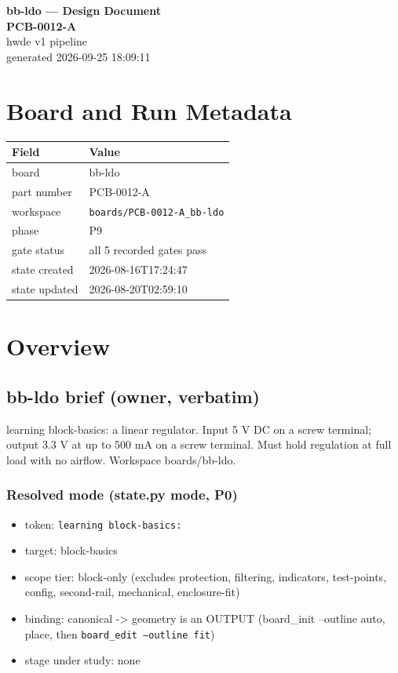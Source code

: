 \documentclass[11pt,a4paper]{article}
\begin{document}
\sloppy
\begin{center}
{\LARGE\bfseries bb-ldo --- Design Document}\\[6pt]
{\Large\bfseries PCB-0012-A}\\[6pt]
{\large hwde v1 pipeline}\\[2pt]
generated 2026-09-25 18:09:11
\end{center}
\tableofcontents

\section{Board and Run Metadata}
{\small
\begin{longtable}{lp{11cm}}
\toprule
\textbf{Field} & \textbf{Value} \\
\midrule
\endhead
board & bb-ldo \\
part number & PCB-0012-A \\
workspace & \texttt{boards/PCB-0012-A\_bb-ldo} \\
phase & P9 \\
gate status & all 5 recorded gates pass \\
state created & 2026-08-16T17:24:47 \\
state updated & 2026-08-20T02:59:10 \\
\bottomrule
\end{longtable}
}
\section{Overview}
\subsection*{bb-ldo brief (owner, verbatim)}
learning block-basics: a linear regulator. Input 5 V DC on a screw terminal; output 3.3 V at up to 500 mA on a screw terminal. Must hold regulation at full load with no airflow. Workspace boards/bb-ldo.

\subsubsection*{Resolved mode (state.py mode, P0)}
\begin{itemize}
\item token: \texttt{learning block-basics:}
\item target: block-basics
\item scope tier: block-only (excludes protection, filtering, indicators,
test-points, config, second-rail, mechanical, enclosure-fit)
\item binding: canonical -\textgreater{} geometry is an OUTPUT (board\_init --outline auto,
place, then \texttt{board\_edit --outline fit})
\item stage under study: none
\end{itemize}
\end{document}
